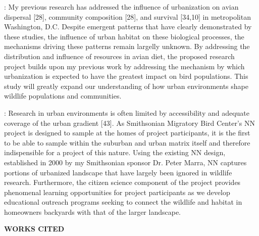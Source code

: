 \documentclass[12pt]{article}
\begin{document}

: 
My previous research has addressed the influence of urbanization on avian dispersal [28], community composition [28], and survival [34,10] in metropolitan Washington, D.C. Despite emergent patterns that have clearly demonstrated by these studies, the influence of urban habitat on these biological processes, the mechanisms driving these patterns remain largelly unknown. By addressing the distribution and influence of resources in avian diet, the proposed research project builds upon my previous work by addressing the mechanism by which urbanization is expected to have the greatest impact on bird populations. This study will greatly expand our understanding of how urban environments shape wildlife populations and communities.


:
Research in urban environments is often limited by accessibility and adequate coverage of the urban gradient [43]. As Smithsonian Migratory Bird Center's NN project is designed to sample at the homes of project participants, it is the first to be able to sample within the suburban and urban matrix itself and therefore indispensible for a project of this nature. Using the existing NN design, established in 2000 by my Smithsonian sponsor Dr. Peter Marra,  NN captures portions of urbanized landscape that have largely been ignored in wildlife research. Furthermore, the citizen science component of the project provides phenomenal learning opportunities for project participants as we develop educational outreach programs seeking to connect the wildlife and habitat in homeowners backyards with that of the larger landscape.

\noindent \begin{center} {\textbf {WORKS CITED}}\end{center} \par
\end{document}
